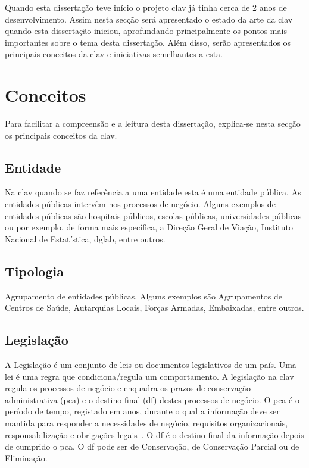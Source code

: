 Quando esta dissertação teve início o projeto \acrshort{clav} já tinha cerca de 2 anos de desenvolvimento. Assim nesta secção será apresentado o estado da arte da \acrshort{clav} quando esta dissertação iniciou, aprofundando principalmente os pontos mais importantes sobre o tema desta dissertação. Além disso, serão apresentados os principais conceitos da \acrshort{clav} e iniciativas semelhantes a esta.

\section{Conceitos}

Para facilitar a compreensão e a leitura desta dissertação, explica-se nesta secção os principais conceitos da \acrshort{clav}.

\subsection{Entidade}
Na \acrshort{clav} quando se faz referência a uma entidade esta é uma entidade pública. As entidades públicas intervêm nos processos de negócio. Alguns exemplos de entidades públicas são hospitais públicos, escolas públicas, universidades públicas ou por exemplo, de forma mais específica, a Direção Geral de Viação, Instituto Nacional de Estatística, \acrlong{dglab}, entre outros.

\subsection{Tipologia}
Agrupamento de entidades públicas. Alguns exemplos são Agrupamentos de Centros de Saúde, Autarquias Locais, Forças Armadas, Embaixadas, entre outros.

\subsection{Legislação}
A Legislação é um conjunto de leis ou documentos legislativos de um país. Uma lei é uma regra que condiciona/regula um comportamento. A legislação na \acrshort{clav} regula os processos de negócio e enquadra os prazos de conservação administrativa (\acrshort{pca}) e o destino final (\acrshort{df}) destes processos de negócio. O \acrshort{pca} é o período de tempo, registado em anos, durante o qual a informação deve ser mantida para responder a necessidades  de  negócio,  requisitos  organizacionais,  responsabilização  e obrigações legais~\cite{pca}. O \acrshort{df} é o destino final da informação depois de cumprido o \acrshort{pca}. O \acrshort{df} pode ser de Conservação, de Conservação Parcial ou de Eliminação.

